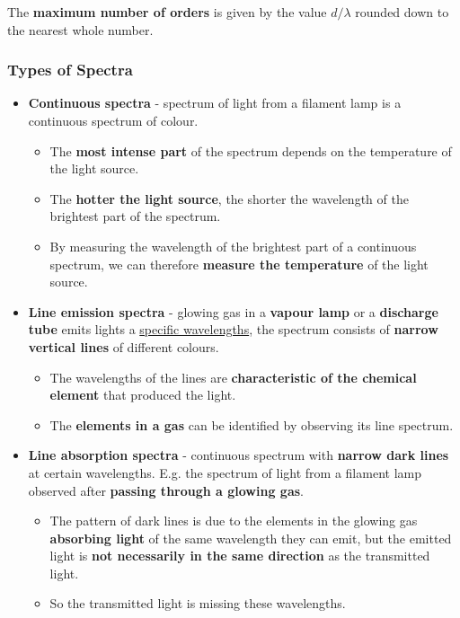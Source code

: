 The \textbf{maximum number of orders} is given by the value $d/\lambda$ rounded down to the nearest whole number.

\subsubsection*{Types of Spectra}

\begin{itemize}
    \item \textbf{Continuous spectra} - spectrum of light from a filament lamp is a continuous spectrum of colour.
        \begin{itemize}
            \item The \textbf{most intense part} of the spectrum depends on the temperature of the light source.
            \item The \textbf{hotter the light source}, the shorter the wavelength of the brightest part of the spectrum.
            \item By measuring the wavelength of the brightest part of a continuous spectrum, we can therefore \textbf{measure the temperature} of the light source.
        \end{itemize}
    \item \textbf{Line emission spectra} - glowing gas in a \textbf{vapour lamp} or a \textbf{discharge tube} emits lights a \underline{specific wavelengths}, the spectrum consists of \textbf{narrow vertical lines} of different colours.
        \begin{itemize}
            \item The wavelengths of the lines are \textbf{characteristic of the chemical element} that produced the light.
            \item The \textbf{elements in a gas} can be identified by observing its line spectrum.
        \end{itemize}
    \item \textbf{Line absorption spectra} - continuous spectrum with \textbf{narrow dark lines} at certain wavelengths. E.g. the spectrum of light from a filament lamp observed after \textbf{passing through a glowing gas}.
        \begin{itemize}
            \item The pattern of dark lines is due to the elements in the glowing gas \textbf{absorbing light} of the same wavelength they can emit, but the emitted light is \textbf{not necessarily in the same direction} as the transmitted light.
            \item So the transmitted light is missing these wavelengths.
        \end{itemize}
\end{itemize}
